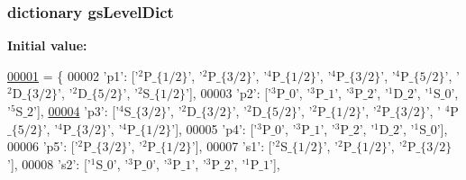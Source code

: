 \subsubsection[{gs\+Level\+Dict}]{\setlength{\rightskip}{0pt plus 5cm}dictionary gs\+Level\+Dict}\label{namespacepyneb_1_1utils_1_1physics_aab0d46710f5ecaa54ca513608a58299f}
{\bfseries Initial value\+:}
\begin{DoxyCode}
\hypertarget{namespacepyneb_1_1utils_1_1physics_l00001}{}\hyperlink{namespacepyneb_1_1utils_1_1physics}{00001} = \{
00002             \textcolor{stringliteral}{'p1'}: [\textcolor{stringliteral}{'$^2$P$\_\{1/2\}$'}, \textcolor{stringliteral}{'$^2$P$\_\{3/2\}$'}, \textcolor{stringliteral}{'$^4$P$\_\{1/2\}$'}, \textcolor{stringliteral}{'$^4$P$\_\{3/2\}$'}, \textcolor{stringliteral}{'$^4$P$\_\{5/2\}$'}, \textcolor{stringliteral}{'
      $^2$D$\_\{3/2\}$'}, \textcolor{stringliteral}{'$^2$D$\_\{5/2\}$'}, \textcolor{stringliteral}{'$^2$S$\_\{1/2\}$'}],
00003             \textcolor{stringliteral}{'p2'}: [\textcolor{stringliteral}{'$^3$P$\_0$'}, \textcolor{stringliteral}{'$^3$P$\_1$'}, \textcolor{stringliteral}{'$^3$P$\_2$'}, \textcolor{stringliteral}{'$^1$D$\_2$'}, \textcolor{stringliteral}{'$^1$S$\_0$'}, \textcolor{stringliteral}{'$^5$S$\_2$'}],
\hypertarget{namespacepyneb_1_1utils_1_1physics_l00004}{}\hyperlink{classpyneb_1_1utils_1_1physics_1_1_c_s_t}{00004}             \textcolor{stringliteral}{'p3'}: [\textcolor{stringliteral}{'$^4$S$\_\{3/2\}$'}, \textcolor{stringliteral}{'$^2$D$\_\{3/2\}$'}, \textcolor{stringliteral}{'$^2$D$\_\{5/2\}$'}, \textcolor{stringliteral}{'$^2$P$\_\{1/2\}$'}, \textcolor{stringliteral}{'$^2$P$\_\{3/2\}$'}, \textcolor{stringliteral}{'
      $^4$P$\_\{5/2\}$'}, \textcolor{stringliteral}{'$^4$P$\_\{3/2\}$'}, \textcolor{stringliteral}{'$^4$P$\_\{1/2\}$'}],
00005             \textcolor{stringliteral}{'p4'}: [\textcolor{stringliteral}{'$^3$P$\_0$'}, \textcolor{stringliteral}{'$^3$P$\_1$'}, \textcolor{stringliteral}{'$^3$P$\_2$'}, \textcolor{stringliteral}{'$^1$D$\_2$'}, \textcolor{stringliteral}{'$^1$S$\_0$'}],
00006             \textcolor{stringliteral}{'p5'}: [\textcolor{stringliteral}{'$^2$P$\_\{3/2\}$'}, \textcolor{stringliteral}{'$^2$P$\_\{1/2\}$'}],
00007             \textcolor{stringliteral}{'s1'}: [\textcolor{stringliteral}{'$^2$S$\_\{1/2\}$'}, \textcolor{stringliteral}{'$^2$P$\_\{1/2\}$'}, \textcolor{stringliteral}{'$^2$P$\_\{3/2\}$'}],
00008             \textcolor{stringliteral}{'s2'}: [\textcolor{stringliteral}{'$^1$S$\_0$'}, \textcolor{stringliteral}{'$^3$P$\_0$'}, \textcolor{stringliteral}{'$^3$P$\_1$'}, \textcolor{stringliteral}{'$^3$P$\_2$'}, \textcolor{stringliteral}{'$^1$P$\_1$'}],

\end{DoxyCode}

